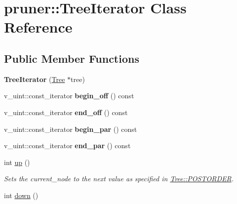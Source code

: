 \hypertarget{classpruner_1_1TreeIterator}{}\section{pruner\+:\+:Tree\+Iterator Class Reference}
\label{classpruner_1_1TreeIterator}
\subsection*{Public Member Functions}
\begin{DoxyCompactItemize}
\item 
{\bfseries Tree\+Iterator} (\hyperlink{classpruner_1_1Tree}{Tree} $\ast$tree)\hypertarget{classpruner_1_1TreeIterator_a743f2a767abbac4da1fcc5b4029b94f2}{}\label{classpruner_1_1TreeIterator_a743f2a767abbac4da1fcc5b4029b94f2}

\item 
v\+\_\+uint\+::const\+\_\+iterator {\bfseries begin\+\_\+off} () const \hypertarget{classpruner_1_1TreeIterator_a5489e283acdd398f614a25d14448a8f3}{}\label{classpruner_1_1TreeIterator_a5489e283acdd398f614a25d14448a8f3}

\item 
v\+\_\+uint\+::const\+\_\+iterator {\bfseries end\+\_\+off} () const \hypertarget{classpruner_1_1TreeIterator_a9f9df3d3c75c8d16f5d1768a6675a41d}{}\label{classpruner_1_1TreeIterator_a9f9df3d3c75c8d16f5d1768a6675a41d}

\item 
v\+\_\+uint\+::const\+\_\+iterator {\bfseries begin\+\_\+par} () const \hypertarget{classpruner_1_1TreeIterator_a3cb8dd28630f065472e135f7db822abf}{}\label{classpruner_1_1TreeIterator_a3cb8dd28630f065472e135f7db822abf}

\item 
v\+\_\+uint\+::const\+\_\+iterator {\bfseries end\+\_\+par} () const \hypertarget{classpruner_1_1TreeIterator_aac5656fc5b550cb8dfa4a9ebd5ea910a}{}\label{classpruner_1_1TreeIterator_aac5656fc5b550cb8dfa4a9ebd5ea910a}

\item 
int \hyperlink{classpruner_1_1TreeIterator_adca1d999f093a69e2f5d044b358e5da7}{up} ()\hypertarget{classpruner_1_1TreeIterator_adca1d999f093a69e2f5d044b358e5da7}{}\label{classpruner_1_1TreeIterator_adca1d999f093a69e2f5d044b358e5da7}

\begin{DoxyCompactList}\small\item\em Sets the {\ttfamily current\+\_\+node} to the next value as specified in \hyperlink{classpruner_1_1Tree_a547937e845fdbceafae4db25cd74f880}{Tree\+::\+P\+O\+S\+T\+O\+R\+D\+ER}. \end{DoxyCompactList}\item 
int \hyperlink{classpruner_1_1TreeIterator_a8534adba213df8f7f1e67bf5005d902e}{down} ()\hypertarget{classpruner_1_1TreeIterator_a8534adba213df8f7f1e67bf5005d902e}{}\label{classpruner_1_1TreeIterator_a8534adba213df8f7f1e67bf5005d902e}


\end{DoxyCompactItemize}
